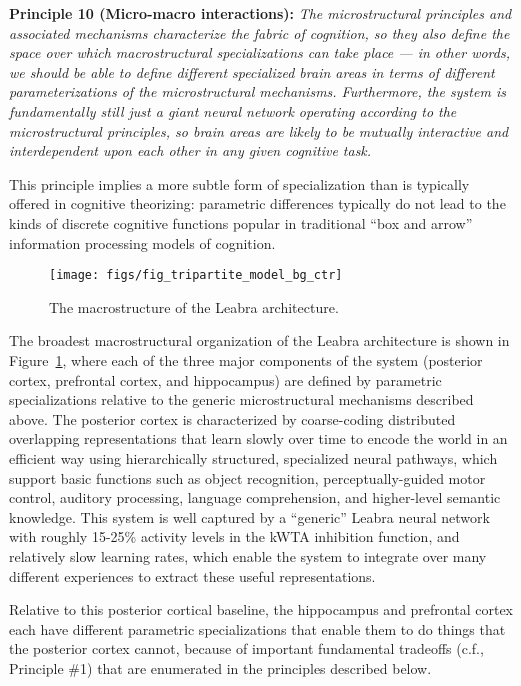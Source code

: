 \documentclass[11pt,twoside]{article}
\begin{document}
{\bf Principle 10 (Micro-macro interactions):} {\em The
  microstructural principles and associated mechanisms characterize
  the fabric of cognition, so they also define the space over which
  macrostructural specializations can take place --- in other words,
  we should be able to define different specialized brain areas in
  terms of different parameterizations of the microstructural
  mechanisms.  Furthermore, the system is fundamentally still just a
  giant neural network operating according to the microstructural
  principles, so brain areas are likely to be mutually interactive and
  interdependent upon each other in any given cognitive task.}

This principle implies a more subtle form of specialization than is
typically offered in cognitive theorizing: parametric differences
typically do not lead to the kinds of discrete cognitive functions
popular in traditional ``box and arrow'' information processing models
of cognition.

\begin{figure}
  \centering\texttt{[image: figs/fig\_tripartite\_model\_bg\_ctr]}
  \caption{\small The macrostructure of the Leabra architecture.}
  \label{fig.tripartite_model}
\end{figure}

The broadest macrostructural organization of the Leabra architecture
is shown in Figure~\ref{fig.tripartite_model}, where each of the three
major components of the system (posterior cortex, prefrontal cortex,
and hippocampus) are defined by parametric specializations relative to
the generic microstructural mechanisms described above.  The posterior
cortex is characterized by coarse-coding distributed overlapping
representations that learn slowly over time to encode the world in an
efficient way using hierarchically structured, specialized neural
pathways, which support basic functions such as object recognition,
perceptually-guided motor control, auditory processing, language
comprehension, and higher-level semantic knowledge.  This system is
well captured by a ``generic'' Leabra neural network with roughly
15-25\% activity levels in the kWTA inhibition function, and
relatively slow learning rates, which enable the system to integrate
over many different experiences to extract these useful
representations.

Relative to this posterior cortical baseline, the hippocampus and
prefrontal cortex each have different parametric specializations that
enable them to do things that the posterior cortex cannot, because of
important fundamental tradeoffs (c.f., Principle \#1) that are
enumerated in the principles described below.
\end{document}
